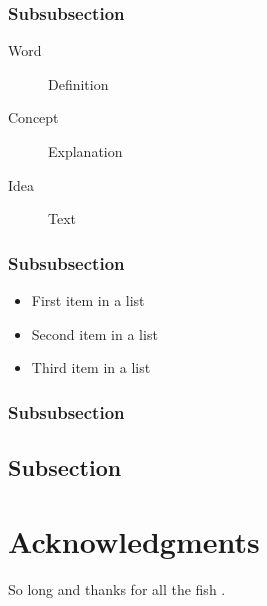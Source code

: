 \documentclass[fleqn,10pt]{SelfArx} %
\begin{document}
\subsubsection{Subsubsection}

\lipsum[12] %

\begin{description}
	\item[Word] Definition
	\item[Concept] Explanation
	\item[Idea] Text
\end{description}

\subsubsection{Subsubsection}

\lipsum[13] %

\begin{itemize}[noitemsep] %
	\item First item in a list
	\item Second item in a list
	\item Third item in a list
\end{itemize}

\subsubsection{Subsubsection}

\lipsum[14] %

\subsection{Subsection}

\lipsum[15-23] %


\section*{Acknowledgments} %


So long and thanks for all the fish \cite{Figueredo:2009dg, Smith:2012qr}.





\end{document}
